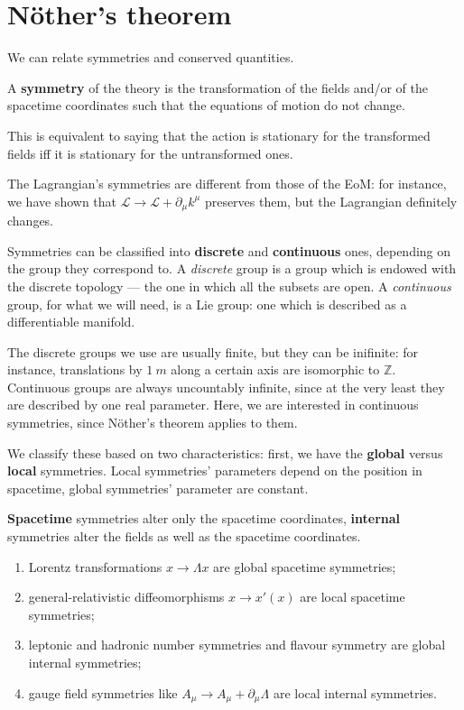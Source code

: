 \documentclass[main.tex]{subfiles}
\begin{document}
\section{Nöther's theorem}


We can relate symmetries and conserved quantities. 

\begin{definition}
A \textbf{symmetry} of the theory is the transformation of the fields and/or of the spacetime coordinates such that the equations of motion do not change.
\end{definition}

This is equivalent to saying that the action is stationary for the transformed fields iff it is stationary for the untransformed ones. 

The Lagrangian's symmetries are different from those of the EoM: for instance, we have shown that \(\mathscr{L} \to \mathscr{L} + \partial_{\mu } k^{\mu }\) preserves them, but the Lagrangian definitely changes. 

Symmetries can be classified into \textbf{discrete} and \textbf{continuous} ones, depending on the group they correspond to. 
A \emph{discrete} group is a group which is endowed with the discrete topology --- the one in which all the subsets are open. 
A \emph{continuous} group, for what we will need, is a Lie group: one which is described as a differentiable manifold. 

The discrete groups we use are usually finite, but they can be inifinite: for instance, translations by \(\SI{1}{m}\) along a certain axis are isomorphic to \(\mathbb{Z}\).  
Continuous groups are always uncountably infinite, since at the very least they are described by one real parameter. 
Here, we are interested in continuous symmetries, since Nöther's theorem applies to them.

We classify these based on two characteristics: first, we have the \textbf{global} versus \textbf{local} symmetries.
Local symmetries' parameters depend on the position in spacetime, global symmetries' parameter are constant. 

\textbf{Spacetime} symmetries alter only the spacetime coordinates, \textbf{internal} symmetries alter the fields as well as the spacetime coordinates. 

\begin{enumerate}
    \item Lorentz transformations \(x \to \Lambda x\) are global spacetime symmetries;
    \item general-relativistic diffeomorphisms \(x \to x'(x)\) are local spacetime symmetries;
    \item leptonic and hadronic number symmetries and flavour symmetry are global internal symmetries;
    \item gauge field symmetries like \(A_{\mu } \to A_{\mu } + \partial_{\mu } \Lambda \) are local internal symmetries. 
\end{enumerate}
\end{document}

